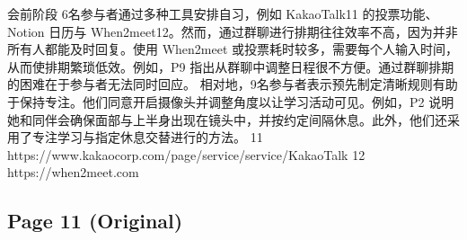 \documentclass[12pt]{ctexart}
\begin{document}
会前阶段
6名参与者通过多种工具安排自习，例如 KakaoTalk11 的投票功能、Notion 日历与 When2meet12。然而，通过群聊进行排期往往效率不高，因为并非所有人都能及时回复。使用 When2meet 或投票耗时较多，需要每个人输入时间，从而使排期繁琐低效。例如，P9 指出从群聊中调整日程很不方便。通过群聊排期的困难在于参与者无法同时回应。
相对地，9名参与者表示预先制定清晰规则有助于保持专注。他们同意开启摄像头并调整角度以让学习活动可见。例如，P2 说明她和同伴会确保面部与上半身出现在镜头中，并按约定间隔休息。此外，他们还采用了专注学习与指定休息交替进行的方法。
11 https://www.kakaocorp.com/page/service/service/KakaoTalk
12 https://when2meet.com


\subsection*{Page 11 (Original)}
\end{document}
